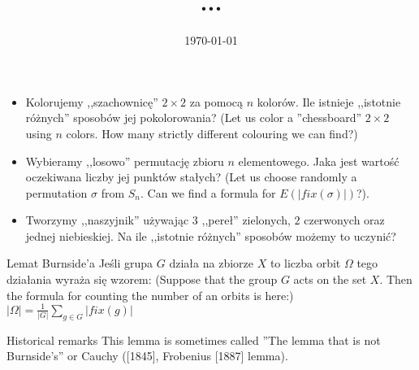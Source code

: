 \documentclass{beamer}
\begin{document}
 
\title[Zliczanie orbit grupy]{
  ...
} 
\author{} 
\date{\today}
\begin{frame} 
  \titlepage 
\end{frame} 
\begin{frame}
\begin{itemize}

\item<1->{
Kolorujemy ,,szachownicę'' $2 \times 2$ za pomocą $n$ kolorów.
Ile istnieje ,,istotnie różnych'' sposobów jej pokolorowania?
(Let us color a ''chessboard'' $2 \times 2$ using $n$ colors.
How many strictly different colouring we can find?)
}
\item<2->{
Wybieramy ,,losowo'' permutację zbioru $n$ elementowego.
Jaka jest wartość oczekiwana liczby jej punktów stałych?
(Let us choose randomly a permutation $\sigma$ from $S_n$. Can we
find a formula for $E(|fix(\sigma)|)$?).
}
\item<3->{
Tworzymy ,,naszyjnik'' używając $3$ ,,pereł'' zielonych, $2$ czerwonych oraz jednej niebieskiej.
Na ile ,,istotnie różnych'' sposobów możemy to uczynić?
}
\end{itemize}
\end{frame}


\begin{frame}
  \begin{block}{Lemat Burnside'a}
    Jeśli grupa $G$ działa na zbiorze $X$ to
    liczba orbit $\Omega$ tego działania
    wyraża się wzorem:
    (Suppose that the group $G$ acts on the set $X$. Then
    the formula for counting the number of an orbits
    is here:)
    $|\Omega| = \frac{1}{|G|} \sum_{g\in G} |fix(g)|$
  \end{block}
  \begin{block}{Historical remarks}
    This lemma is sometimes called ''The lemma that is not Burnside's''
    or Cauchy ([1845], Frobenius [1887] lemma).
    \end{block}
\end{frame}
\end{document}
